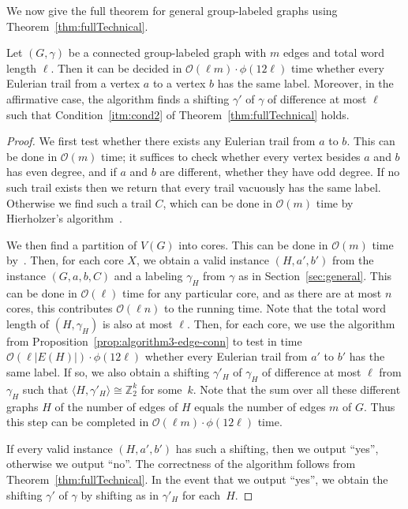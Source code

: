 \documentclass[a4paper, 12pt]{article}
\begin{document}
We now give the full theorem for general group-labeled graphs using Theorem~\ref{thm:fullTechnical}.

\begin{theorem}
\label{thm:algorithm-general}
    Let $(G,\gamma)$ be a connected group-labeled graph with $m$ edges and total word length $\ell$. Then it can be decided in $\mathcal{O}(\ell m)\cdot \phi(12\ell)$ time whether every Eulerian trail from a vertex $a$ to a vertex $b$ has the same label. Moreover, in the affirmative case, the algorithm finds a shifting $\gamma'$ of $\gamma$ of difference at most $\ell$ such that Condition~\ref{itm:cond2} of Theorem~\ref{thm:fullTechnical} holds.
\end{theorem}
\begin{proof}
    We first test whether there exists any Eulerian trail from $a$ to $b$. This can be done in $\mathcal{O}(m)$ time; it suffices to check whether every vertex besides $a$ and $b$ has even degree, and if $a$ and $b$ are different, whether they have odd degree. If no such trail exists then we return that every trail vacuously has the same label. Otherwise we find such a trail $C$, which can be done in $\mathcal{O}(m)$ time by Hierholzer's algorithm~\cite{hierholzer1873moglichkeit}.
    
    We then find a partition of $V(G)$ into cores. This can be done in $\mathcal{O}(m)$ time by~\cite{NagamochiIbarakiCore}. Then, for each core $X$, we obtain a valid instance $(H,a',b')$ from the instance $(G,a,b,C)$ and a labeling $\gamma_H$ from $\gamma$ as in Section~\ref{sec:general}. This can be done in $\mathcal{O}(\ell)$ time for any particular core, and as there are at most $n$ cores, this contributes $\mathcal{O}(\ell n)$ to the running time. Note that the total word length of $(H, \gamma_H)$ is also at most $\ell$. Then, for each core, we use the algorithm from Proposition~\ref{prop:algorithm3-edge-conn} to test in time $\mathcal{O}(\ell|E(H)|)\cdot \phi(12\ell)$ whether every Eulerian trail from $a'$ to $b'$ has the same label. If so, we also obtain a shifting $\gamma'_H$ of $\gamma_H$ of difference at most $\ell$ from $\gamma_H$ such that $\langle H, \gamma'_H\rangle \cong \mathbb{Z}_2^k$ for some~$k$. Note that the sum over all these different graphs $H$ of the number of edges of $H$ equals the number of edges $m$ of $G$. Thus this step can be completed in $\mathcal{O}(\ell m)\cdot \phi(12\ell)$ time.
    
    If every valid instance $(H,a',b')$ has such a shifting, then we output ``yes'', otherwise we output ``no''. The correctness of the algorithm follows from Theorem~\ref{thm:fullTechnical}. In the event that we output ``yes'', we obtain the shifting $\gamma'$ of $\gamma$ by shifting as in $\gamma'_H$ for each~$H$.
\end{proof}   
    
\end{document}
